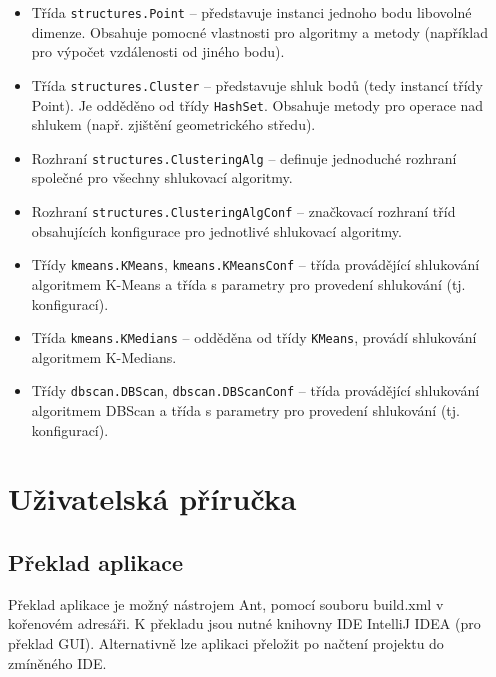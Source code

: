 \documentclass[pdftex,a4paper]{article}
\begin{document}
\medskip

\begin{itemize}
	\item Třída \texttt{structures.Point} -- představuje instanci jednoho bodu libovolné dimenze. Obsahuje pomocné vlastnosti pro algoritmy a metody (například pro výpočet vzdálenosti od jiného bodu).
	
	\item Třída \texttt{structures.Cluster} -- představuje shluk bodů (tedy instancí třídy Point). Je odděděno od třídy \texttt{HashSet}. Obsahuje metody pro operace nad shlukem (např. zjištění geometrického středu).
	
	\item Rozhraní \texttt{structures.ClusteringAlg} -- definuje jednoduché rozhraní společné pro všechny shlukovací algoritmy.
	
	\item Rozhraní \texttt{structures.ClusteringAlgConf} -- značkovací rozhraní tříd obsahujících konfigurace pro jednotlivé shlukovací algoritmy.
\end{itemize}

\medskip

\begin{itemize}
	\item Třídy \texttt{kmeans.KMeans}, \texttt{kmeans.KMeansConf} -- třída provádějící shlukování algoritmem K-Means a třída s parametry pro provedení shlukování (tj. konfigurací).
	
	\item Třída \texttt{kmeans.KMedians} -- odděděna od třídy \texttt{KMeans}, provádí shlukování algoritmem K-Medians.
	
	\item Třídy \texttt{dbscan.DBScan}, \texttt{dbscan.DBScanConf} -- třída provádějící shlukování algoritmem DBScan a třída s parametry pro provedení shlukování (tj. konfigurací).
\end{itemize}


\newpage

\section{Uživatelská příručka}

\subsection{Překlad aplikace}
Překlad aplikace je možný nástrojem Ant, pomocí souboru build.xml v kořenovém adresáři. K překladu jsou nutné knihovny IDE IntelliJ IDEA (pro překlad GUI). Alternativně lze aplikaci přeložit po načtení projektu do zmíněného IDE.
\end{document}
